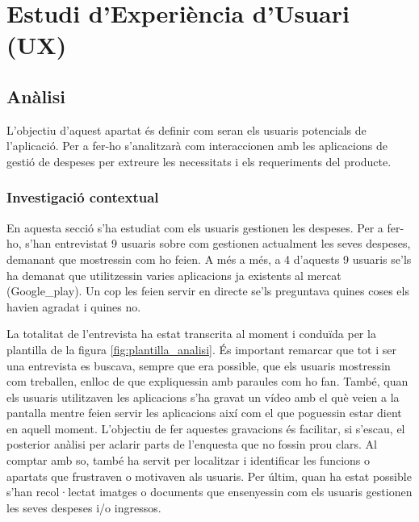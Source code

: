 \chapter{Estudi d'Experiència d'Usuari (UX)}

\section{Anàlisi}
L'objectiu d'aquest apartat és definir com seran els usuaris potencials de l'aplicació. Per a fer-ho s'analitzarà com interaccionen amb les aplicacions de gestió de despeses per extreure les necessitats i els requeriments del producte.

\subsection{Investigació contextual}
En aquesta secció s'ha estudiat com els usuaris gestionen les despeses. Per a fer-ho, s'han entrevistat 9 usuaris sobre com gestionen actualment les seves despeses, demanant que mostressin com ho feien. A més a més, a 4 d'aquests 9 usuaris se'ls ha demanat que utilitzessin varies aplicacions ja existents al mercat (\gls{Google_play}). Un cop les feien servir en directe se'ls preguntava quines coses els havien agradat i quines no. 

La totalitat de l'entrevista ha estat transcrita al moment i conduïda per la plantilla de la figura \ref{fig:plantilla_analisi}. És important remarcar que tot i ser una entrevista es buscava, sempre que era possible, que els usuaris mostressin com treballen, enlloc de que expliquessin amb paraules com ho fan. També, quan els usuaris utilitzaven les aplicacions s'ha gravat un vídeo amb el què veien a la pantalla mentre feien servir les aplicacions així com el que poguessin estar dient en aquell moment. L'objectiu de fer aquestes gravacions és facilitar, si s'escau, el posterior anàlisi per aclarir parts de l'enquesta que no fossin prou clars. Al comptar amb so, també ha servit per localitzar i identificar les funcions o apartats que frustraven o motivaven als usuaris. Per últim, quan ha estat possible s'han recol·lectat imatges o documents que ensenyessin com els usuaris gestionen les seves despeses i/o ingressos. 

